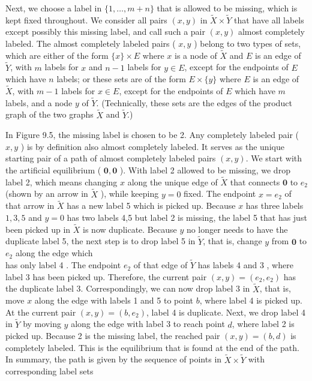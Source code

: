 \documentclass[12pt]{article}
\begin{document}
Next, we choose a label in $\{1, \ldots, m+n\}$ that is allowed to be missing, which is kept fixed throughout. We consider all pairs $(x, y)$ in $\tilde{X} \times \tilde{Y}$ that have all labels except possibly this missing label, and call such a pair $(x, y)$ almost completely labeled. The almost completely labeled pairs ( $x, y$ ) belong to two types of sets, which are either of the form $\{x\} \times E$ where $x$ is a node of $\tilde{X}$ and $E$ is an edge of $\tilde{Y}$, with $m$ labels for $x$ and $n-1$ labels for $y \in E$, except for the endpoints of $E$ which have $n$ labels; or these sets are of the form $E \times\{y\}$ where $E$ is an edge of $\tilde{X}$, with $m-1$ labels for $x \in E$, except for the endpoints of $E$ which have $m$ labels, and a node $y$ of $\tilde{Y}$. (Technically, these sets are the edges of the product graph of the two graphs $\tilde{X}$ and $\tilde{Y}$.)

In Figure 9.5, the missing label is chosen to be 2. Any completely labeled pair ( $x, y$ ) is by definition also almost completely labeled. It serves as the unique starting pair of a path of almost completely labeled pairs $(x, y)$. We start with the artificial equilibrium ( $\mathbf{0}, \mathbf{0}$ ). With label 2 allowed to be missing, we drop label 2, which means changing $x$ along the unique edge of $\tilde{X}$ that connects $\mathbf{0}$ to $e_{2}$ (shown by an arrow in $\tilde{X}$ ), while keeping $y=0$ fixed. The endpoint $x=e_{2}$ of that arrow in $\tilde{X}$ has a new label 5 which is picked up. Because $x$ has three labels $1,3,5$ and $y=0$ has two labels 4,5 but label 2 is missing, the label 5 that has just been picked up in $\tilde{X}$ is now duplicate. Because $y$ no longer needs to have the duplicate label 5, the next step is to drop label 5 in $\tilde{Y}$, that is, change $y$ from $\mathbf{0}$ to $e_{2}$ along the edge which\\
has only label 4 . The endpoint $e_{2}$ of that edge of $\tilde{Y}$ has labels 4 and 3 , where label 3 has been picked up. Therefore, the current pair $(x, y)=\left(e_{2}, e_{2}\right)$ has the duplicate label 3. Correspondingly, we can now drop label 3 in $\tilde{X}$, that is, move $x$ along the edge with labels 1 and 5 to point $b$, where label 4 is picked up. At the current pair $(x, y)=\left(b, e_{2}\right)$, label 4 is duplicate. Next, we drop label 4 in $\tilde{Y}$ by moving $y$ along the edge with label 3 to reach point $d$, where label 2 is picked up. Because 2 is the missing label, the reached pair $(x, y)=(b, d)$ is completely labeled. This is the equilibrium that is found at the end of the path. In summary, the path is given by the sequence of points in $\tilde{X} \times \tilde{Y}$ with corresponding label sets
\end{document}
